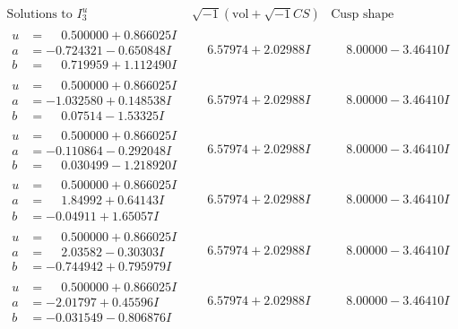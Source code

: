\documentclass[1p]{elsarticle_modified}
\theoremstyle{definition}
\newcommand{\I}{\sqrt{-1}}
\begin{document}
$$\begin{array}{c|c|c}  
\text{Solutions to }I^u_{3}& \I (\text{vol} + \sqrt{-1}CS) & \text{Cusp shape}\\
 \hline 
\begin{aligned}
u &= \phantom{-}0.500000 + 0.866025 I \\
a &= -0.724321 - 0.650848 I \\
b &= \phantom{-}0.719959 + 1.112490 I\end{aligned}
 & \phantom{-}6.57974 + 2.02988 I & \phantom{-}8.00000 - 3.46410 I \\ \hline\begin{aligned}
u &= \phantom{-}0.500000 + 0.866025 I \\
a &= -1.032580 + 0.148538 I \\
b &= \phantom{-}0.07514 - 1.53325 I\end{aligned}
 & \phantom{-}6.57974 + 2.02988 I & \phantom{-}8.00000 - 3.46410 I \\ \hline\begin{aligned}
u &= \phantom{-}0.500000 + 0.866025 I \\
a &= -0.110864 - 0.292048 I \\
b &= \phantom{-}0.030499 - 1.218920 I\end{aligned}
 & \phantom{-}6.57974 + 2.02988 I & \phantom{-}8.00000 - 3.46410 I \\ \hline\begin{aligned}
u &= \phantom{-}0.500000 + 0.866025 I \\
a &= \phantom{-}1.84992 + 0.64143 I \\
b &= -0.04911 + 1.65057 I\end{aligned}
 & \phantom{-}6.57974 + 2.02988 I & \phantom{-}8.00000 - 3.46410 I \\ \hline\begin{aligned}
u &= \phantom{-}0.500000 + 0.866025 I \\
a &= \phantom{-}2.03582 - 0.30303 I \\
b &= -0.744942 + 0.795979 I\end{aligned}
 & \phantom{-}6.57974 + 2.02988 I & \phantom{-}8.00000 - 3.46410 I \\ \hline\begin{aligned}
u &= \phantom{-}0.500000 + 0.866025 I \\
a &= -2.01797 + 0.45596 I \\
b &= -0.031549 - 0.806876 I\end{aligned}
 & \phantom{-}6.57974 + 2.02988 I & \phantom{-}8.00000 - 3.46410 I \\ \hline\begin{aligned}

\end{aligned}
\end{array}$$
\end{document}
